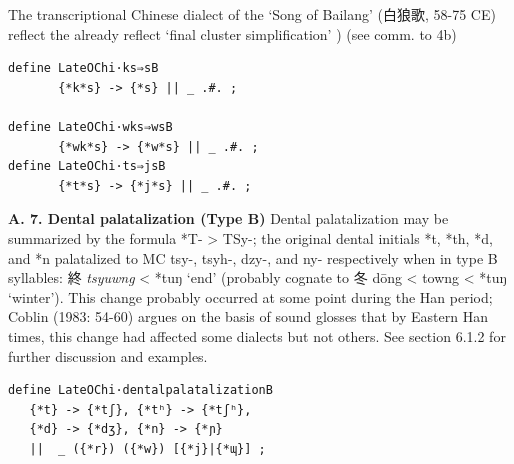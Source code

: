 \documentclass[xetex, svgnames, 12pt]{scrartcl}
\newcounter{para}
\newcommand\mypara[1]{\par\refstepcounter{para}\textbf{\thepara\space#1\space}}
\begin{document}
The transcriptional Chinese dialect of the `Song of Bailang' (白狼歌, 58-75 CE) reflect the already reflect `final cluster simplification' \citep[568]{Baxter1992}) \citep{Hill2017Bailang}
  (see comm. to 4b)


\begin{verbatim}
define LateOChi·ks⇒sB 
       {*k*s} -> {*s} || _ .#. ;

define LateOChi·wks⇒wsB 
       {*wk*s} -> {*w*s} || _ .#. ;
define LateOChi·ts⇒jsB 
       {*t*s} -> {*j*s} || _ .#. ;

\end{verbatim} 

\mypara{A. 7. Dental palatalization (Type B)}
 Dental palatalization may be summarized by the formula *T- > TSy-; the original dental
 initials *t, *th, *d, and *n palatalized to MC tsy-, tsyh-, dzy-, and ny- respectively when
 in type B syllables:
 終 %
 \textit{tsyuwng} < *tuŋ `end' 
 (probably cognate to 冬 dōng < towng < *tuŋ `winter').
 This change probably occurred at some point during the Han period; Coblin (1983: 54-60)
 argues on the basis of sound glosses that by Eastern Han times, this change had affected
 some dialects but not others. See section 6.1.2 for further discussion and examples.
 \begin{verbatim}
define LateOChi·dentalpalatalizationB 
   {*t} -> {*tʃ}, {*tʰ} -> {*tʃʰ}, 
   {*d} -> {*dʒ}, {*n} -> {*ɲ} 
   ||  _ ({*r}) ({*w}) [{*j}|{*ɰ}] ; 
 \end{verbatim}
\end{document}

